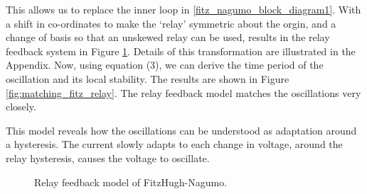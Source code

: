 \documentclass[a4paper, 12pt]{article}
\begin{document}
This allows us to replace the inner loop in \ref{fitz_nagumo_block_diagram1}. With a shift in co-ordinates to make the `relay' symmetric about the orgin, and a change of basis so that an unskewed relay can be used, results in the relay feedback system in Figure \ref{fig:fitz_nagumo_relay_block_diagram}. Details of this transformation are illustrated in the Appendix. Now, using equation (3), we can derive the time period of the oscillation and its local stability. The results are shown in Figure \ref{fig:matching_fitz_relay}. The relay feedback model matches the oscillations very closely. 

This model reveals how the oscillations can be understood as adaptation around a hysteresis. The current slowly adapts to each change in voltage, around the relay hysteresis, causes the voltage to oscillate. 

\begin{figure}[h!]

\caption{Relay feedback model of FitzHugh-Nagumo.}
\label{fig:fitz_nagumo_relay_block_diagram}
\end{figure}
\end{document}
